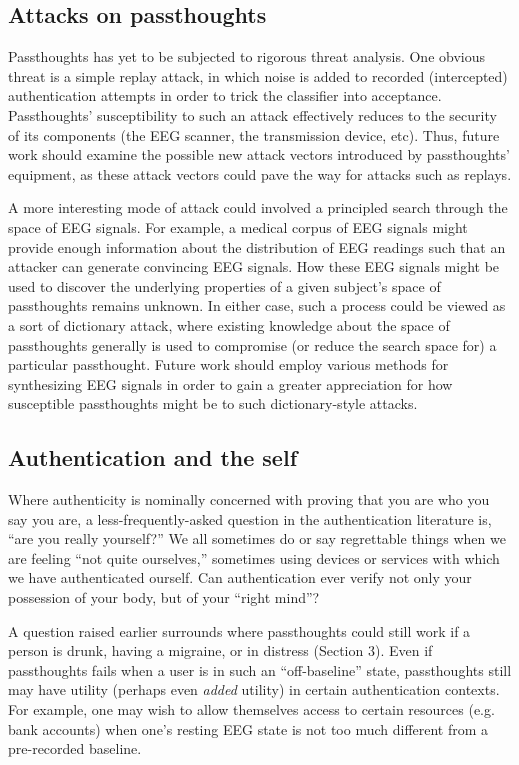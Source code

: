 \documentclass[sigconf]{acmart}
\begin{document}
\subsection{Attacks on passthoughts}
\label{sec:orgbd5fb9d}

Passthoughts has yet to be subjected to rigorous threat analysis. One obvious
threat is a simple replay attack, in which noise is added to recorded
(intercepted) authentication attempts in order to trick the classifier into
acceptance. Passthoughts' susceptibility to such an attack effectively reduces
to the security of its components (the EEG scanner, the transmission device,
etc). Thus, future work should examine the possible new attack vectors
introduced by passthoughts' equipment, as these attack vectors
could pave the way for attacks such as replays.

A more interesting mode of attack could involved a principled search through the
space of EEG signals. For example, a medical corpus of EEG signals might provide
enough information about the distribution of EEG readings such that an attacker
can generate convincing EEG signals. How these EEG signals might be used to
discover the underlying properties of a given subject's space of passthoughts
remains unknown. In either case, such a process could be viewed as a sort of
dictionary attack, where existing knowledge about the space of passthoughts
generally is used to compromise (or reduce the search space for) a particular
passthought. Future work should employ various methods for synthesizing EEG
signals in order to gain a greater appreciation for how susceptible passthoughts
might be to such dictionary-style attacks.

\subsection{Authentication and the self}
\label{sec:org297fe9f}

Where authenticity is nominally concerned with proving that you are who you say
you are, a less-frequently-asked question in the authentication literature is,
``are you really yourself?'' We all sometimes do or say regrettable things when
we are feeling ``not quite ourselves,'' sometimes using devices or services with
which we have authenticated ourself. Can authentication ever verify not only
your possession of your body, but of your ``right mind''?

A question raised earlier surrounds where passthoughts could still work if a
person is drunk, having a migraine, or in distress (Section 3). Even if
passthoughts fails when a user is in such an ``off-baseline'' state,
passthoughts still may have utility (perhaps even \emph{added} utility) in certain
authentication contexts. For example, one may wish to allow themselves access to
certain resources (e.g. bank accounts) when one's resting EEG state is not too
much different from a pre-recorded baseline.
\end{document}
